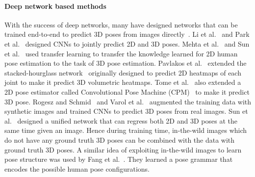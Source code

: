 \documentclass[runningheads]{llncs}
\begin{document}
\paragraph{Deep network based methods}
With the success of deep networks, many have designed networks that can be trained end-to-end to predict 3D poses from images directly~\cite{volumetric,li20143d,tekin2016structured,park20163d,mehta2016monocular,sun2017compositional,zhou2016deep,varol_2017,RogezS16,tome2017lifting}. Li et al.~\cite{li20143d} and Park et al.~\cite{park20163d} designed CNNs to jointly predict 2D and 3D poses. Mehta et al.~\cite{mehta2016monocular} and Sun et al.~\cite{sun2017compositional} used transfer learning to transfer the knowledge learned for 2D human pose estimation to the task of 3D pose estimation. Pavlakos et al.~\cite{volumetric} extended the stacked-hourglass network~\cite{stacked-hourglass} originally designed to predict 2D heatmaps of each joint to make it predict 3D volumetric heatmaps. Tome  et al.~\cite{tome2017lifting} also extended a 2D pose estimator called Convolutional Pose Machine (CPM)~\cite{cpm} to make it predict 3D pose. Rogesz and Schmid~\cite{RogezS16} and Varol et al.~\cite{varol_2017} augmented the training data with synthetic images and trained CNNs to predict 3D poses from real images. Sun et al.~\cite{sun2017compositional} designed a unified network that can regress both 2D and 3D poses at the same time given an image. Hence during training time, in-the-wild images which do not have any ground truth 3D poses can be combined with the data with ground truth 3D poses. A similar idea of exploiting in-the-wild images to learn pose structure was used by Fang et al.~\cite{fang2017learning}. They learned a pose grammar that encodes the possible human pose configurations.
\end{document}

